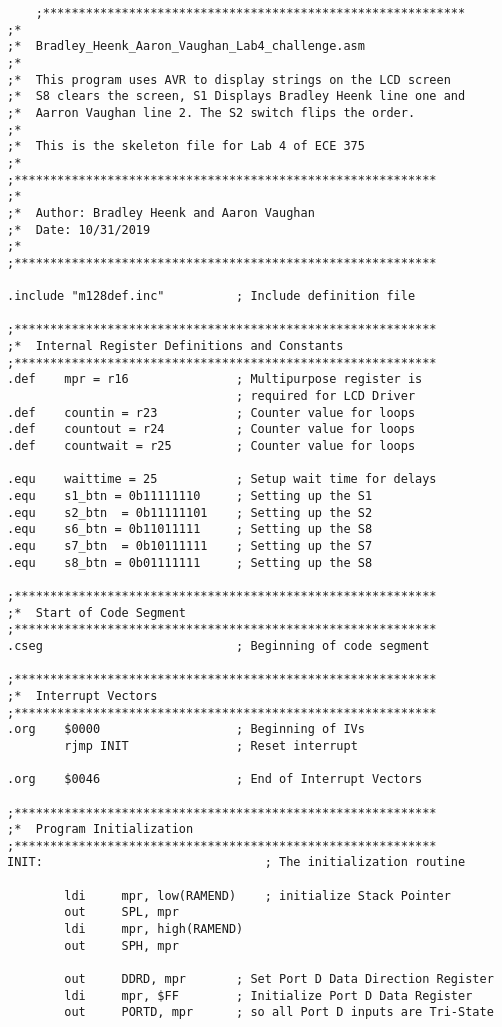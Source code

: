 \documentclass[12pt, letterpaper]{article}
\begin{document}
\begin{verbatim}
    ;***********************************************************
;*
;*	Bradley_Heenk_Aaron_Vaughan_Lab4_challenge.asm
;*
;*	This program uses AVR to display strings on the LCD screen
;*	S8 clears the screen, S1 Displays Bradley Heenk line one and
;*	Aarron Vaughan line 2. The S2 switch flips the order.
;*
;*	This is the skeleton file for Lab 4 of ECE 375
;*
;***********************************************************
;*
;*	Author: Bradley Heenk and Aaron Vaughan
;*	Date: 10/31/2019
;*
;***********************************************************

.include "m128def.inc"			; Include definition file

;***********************************************************
;*	Internal Register Definitions and Constants
;***********************************************************
.def	mpr = r16				; Multipurpose register is
								; required for LCD Driver
.def	countin = r23			; Counter value for loops
.def	countout = r24			; Counter value for loops
.def	countwait = r25			; Counter value for loops

.equ	waittime = 25			; Setup wait time for delays
.equ	s1_btn = 0b11111110		; Setting up the S1
.equ	s2_btn	= 0b11111101	; Setting up the S2
.equ	s6_btn = 0b11011111		; Setting up the S8
.equ	s7_btn	= 0b10111111	; Setting up the S7
.equ	s8_btn = 0b01111111		; Setting up the S8

;***********************************************************
;*	Start of Code Segment
;***********************************************************
.cseg							; Beginning of code segment

;***********************************************************
;*	Interrupt Vectors
;***********************************************************
.org	$0000					; Beginning of IVs
 		rjmp INIT				; Reset interrupt

.org	$0046					; End of Interrupt Vectors

;***********************************************************
;*	Program Initialization
;***********************************************************
INIT:								; The initialization routine

		ldi		mpr, low(RAMEND)	; initialize Stack Pointer
		out		SPL, mpr			
		ldi		mpr, high(RAMEND)
		out		SPH, mpr

		out		DDRD, mpr		; Set Port D Data Direction Register
		ldi		mpr, $FF		; Initialize Port D Data Register
		out		PORTD, mpr		; so all Port D inputs are Tri-State


\end{verbatim}
\end{document}
